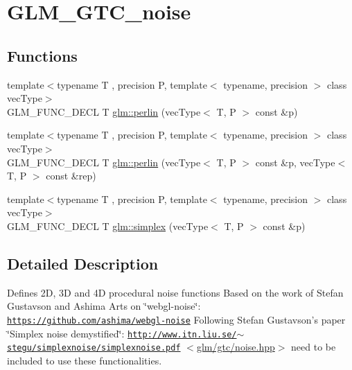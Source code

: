 \hypertarget{group__gtc__noise}{\section{G\-L\-M\-\_\-\-G\-T\-C\-\_\-noise}
\label{group__gtc__noise}
}
\subsection*{Functions}
\begin{DoxyCompactItemize}
\item 
{\footnotesize template$<$typename T , precision P, template$<$ typename, precision $>$ class vec\-Type$>$ }\\G\-L\-M\-\_\-\-F\-U\-N\-C\-\_\-\-D\-E\-C\-L T \hyperlink{group__gtc__noise_ga14e5975486b2b36e747861d3c65b16c1}{glm\-::perlin} (vec\-Type$<$ T, P $>$ const \&p)
\item 
{\footnotesize template$<$typename T , precision P, template$<$ typename, precision $>$ class vec\-Type$>$ }\\G\-L\-M\-\_\-\-F\-U\-N\-C\-\_\-\-D\-E\-C\-L T \hyperlink{group__gtc__noise_ga7e103ffffacb322fe2d4863c372ae2fd}{glm\-::perlin} (vec\-Type$<$ T, P $>$ const \&p, vec\-Type$<$ T, P $>$ const \&rep)
\item 
{\footnotesize template$<$typename T , precision P, template$<$ typename, precision $>$ class vec\-Type$>$ }\\G\-L\-M\-\_\-\-F\-U\-N\-C\-\_\-\-D\-E\-C\-L T \hyperlink{group__gtc__noise_ga05f5ab240c9a3fdeee353636e464c285}{glm\-::simplex} (vec\-Type$<$ T, P $>$ const \&p)
\end{DoxyCompactItemize}


\subsection{Detailed Description}
Defines 2\-D, 3\-D and 4\-D procedural noise functions Based on the work of Stefan Gustavson and Ashima Arts on \char`\"{}webgl-\/noise\char`\"{}\-: \href{https://github.com/ashima/webgl-noise}{\tt https\-://github.\-com/ashima/webgl-\/noise} Following Stefan Gustavson's paper \char`\"{}\-Simplex noise demystified\char`\"{}\-: \href{http://www.itn.liu.se/~stegu/simplexnoise/simplexnoise.pdf}{\tt http\-://www.\-itn.\-liu.\-se/$\sim$stegu/simplexnoise/simplexnoise.\-pdf} $<$\hyperlink{gtc_2noise_8hpp}{glm/gtc/noise.\-hpp}$>$ need to be included to use these functionalities. 

